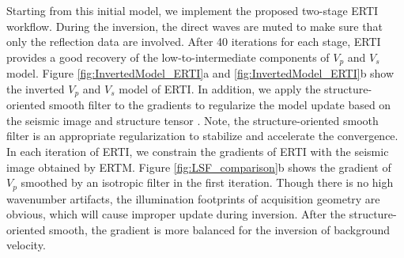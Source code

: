 Starting from this initial model, we implement the proposed two-stage ERTI workflow.
During the inversion, the direct waves are muted to make sure that only the reflection data are involved.
After
40 iterations for each stage, ERTI provides a good recovery of the low-to-intermediate components of
$V_p$ and $V_s$ model. 
Figure \ref{fig:InvertedModel_ERTI}a and \ref{fig:InvertedModel_ERTI}b show the inverted $V_p$ and $V_s$ model of ERTI.
In addition, we apply the structure-oriented smooth filter to the gradients to regularize the
model update based on the seismic image and structure tensor \cite[]{Hale2009Structure,
Ma2010, Williamson2011}.
Note, the structure-oriented smooth filter is an appropriate regularization to stabilize
and accelerate the convergence. 
In each iteration of ERTI, we constrain the gradients of ERTI with the seismic image
obtained by ERTM. Figure \ref{fig:LSF_comparison}b shows the gradient of
$V_p$ smoothed by an isotropic filter in the first iteration. Though there is no high wavenumber
artifacts, the illumination footprints of acquisition geometry are obvious, which will cause
improper update during inversion. After the structure-oriented smooth, the gradient is more balanced
for the inversion of background velocity. 

